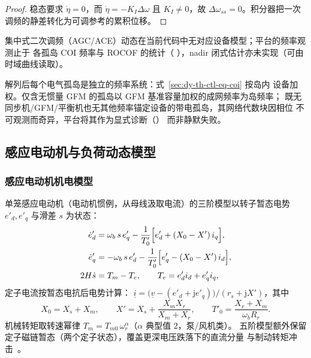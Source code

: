 \begin{proof}
稳态要求 $\dot\eta=0$，而 $\dot\eta=-K_I\Delta\omega$ 且 $K_I\neq0$，故
$\Delta\omega_{ss}=0$。积分器把一次调频的静差转化为可调参考的累积位移。
\end{proof}

\begin{gapnote}
集中式二次调频（AGC/ACE）动态在当前代码中无对应设备模型；平台的频率观测止于
各孤岛 COI 频率与 ROCOF 的统计（
），nadir
闭式估计亦未实现（可由时域曲线读取）。
\end{gapnote}

\begin{remark}[孤岛频率与无锚孤岛]
解列后每个电气孤岛是独立的频率系统：式~\eqref{sec:dy-th-ctl-eq-coi} 按岛内
设备加权。仅含无惯量 GFM 的孤岛以 GFM 基准容量加权的成网频率为岛频率；
既无同步机/GFM/平衡机也无其他频率锚定设备的带电孤岛，其网络代数块因相位
不可观测而奇异，平台将其作为显式诊断（）
而非静默失败。
\end{remark}

\subsection{感应电动机与负荷动态模型}\label{sec:dy-th-ctl-load}

\subsubsection{感应电动机机电模型}

\begin{definition}[三阶暂态电势模型]\label{sec:dy-th-ctl-def-im}
单笼感应电动机（电动机惯例，从母线汲取电流）的三阶模型以转子暂态电势
$e'_d,e'_q$ 与滑差 $s$ 为状态：
\begin{align}
\dot e'_d &= \omega_b\,s\,e'_q-\frac{1}{T'_0}\Bigl[e'_d+(X_0-X')\,i_q\Bigr],\\
\dot e'_q &= -\omega_b\,s\,e'_d-\frac{1}{T'_0}\Bigl[e'_q-(X_0-X')\,i_d\Bigr],\\
2H\dot s &= T_m-T_e,\qquad T_e=e'_di_d+e'_qi_q,
\label{sec:dy-th-ctl-eq-im}
\end{align}
定子电流按暂态电抗后电势计算：
$\underline i=\bigl(\underline v-(e'_d+\mathrm je'_q)\bigr)/(r_s+\mathrm jX')$，其中
\begin{equation}
X_0=X_s+X_m,\qquad
X'=X_s+\frac{X_mX_r}{X_m+X_r},\qquad
T'_0=\frac{X_r+X_m}{\omega_b R_r}.
\label{sec:dy-th-ctl-eq-imparam}
\end{equation}
机械转矩取转速幂律 $T_m=T_{m0}\,\omega_r^{\alpha}$（$\alpha$ 典型值 $2$，泵/风机类）。
五阶模型额外保留定子磁链暂态（两个定子状态），覆盖更深电压跌落下的直流分量
与制动转矩冲击~\cite{ctl:load-tf}。
\end{definition}

